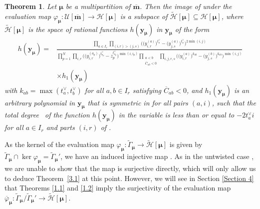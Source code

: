 \documentclass[pdftex]{sigma}
\numberwithin{equation}{section}
\newtheorem{Theorem}{Theorem}[section]
\begin{document}
\begin{Theorem}\label{3.9}
Let $\bm{\mu}$ be a multipartition of $\overline{\mathbf{m}}$. Then the image \smash{$\varphi_{\bm{\mu}}\bigl(\tilde{\Gamma}_{\bm{\mu}}\bigr)$} of \smash{$\tilde{\Gamma}_{\bm{\mu}}$} under the evaluation map $\varphi_{\bm{\mu}}\colon\mathcal{U}[\overline{\mathbf{m}}]\to \mathcal{H}[\bm{\mu}]$ is a subspace of $\tilde{\mathcal{H}}[\bm{\mu}]\subseteq\mathcal{H}[\bm{\mu}]$, where $\tilde{ \mathcal{H}}[\bm{\mu}]$ is the space of rational functions
$h(\mathbf{y}_{\bm{\mu}})$ in $\mathbf{y}_{\bm{\mu}}$ of the form
\begin{align}
h(\mathbf{y}_{\bm{\mu}})
={}&\frac{\prod_{a\in I_r}\prod_{(i,r)>(j,s)}\bigl(\bigl(y_{i,r}^{(a)}\bigr)^{t_a^{\vee}}-\bigl(y_{j,s}^{(a)}\bigr) ^{t_a^{\vee}}\bigr)^{2\min(i,j)}}{\prod_{p=1}^N \prod_{i,r}\bigl(\bigl(y_{i,r}^{(a_p)}\bigr)^{t_{a_p}^{\vee}}-z_p^{t_{a_p} ^{\vee}})^{\min(i,i_p)}\prod_{\substack{a<b\\ \overline{C}_{ab}<0}}\prod_{i, j,r,s}\bigl(\bigl(y_{i,r}^{(a)}\bigr)^{k_{ab}}-\bigl(y_{j,s}^{(b)}\bigr) ^{k_{ab}}\bigr)^{\min(i,j)}}\nonumber\\
&\times h_1(\mathbf{y}_{\bm{\mu}})\label{eq:3.45}
\end{align}
with $k_{ab}=\max(t_a^{\vee},t_b^{\vee})$ for all $a,b\in I_r$ satisfying $\overline{C}_{ab}<0$, and $h_1(\mathbf{y}_{\bm{ \mu}})$ is an arbitrary polynomial in $\mathbf{y}_{\bm{\mu}}$ that is symmetric in  for all pairs $(a,i)$, such that the total degree~ of the function $h(\mathbf{y}_{\bm{ \mu}})$ in the variable  is less than or equal to $-2t_a^{\vee}i$ for all $a\in I_r$ and parts $(i,r)$ of .
\end{Theorem}

As the kernel of the evaluation map $\varphi_{\bm{\mu}} \colon\tilde{\Gamma}_{\bm{\mu}}\to\tilde{\mathcal{H}}[\bm{\mu}]$ is given by $\tilde{\Gamma}_{\bm{\mu}}\cap\ker\varphi_{\bm{\mu}} =\tilde{\Gamma}_{\bm{\mu}}'$, we have an induced injective map . As in the untwisted case \cite{AK07,AKS06}, we are unable to show that the map  is surjective directly, which will only allow us to deduce Theorem~\ref{3.1} at this point. However, we will see in Section \ref{Section 4} that Theorems \ref{1.1} and \ref{1.2} imply the surjectivity of the evaluation map $\overline{\varphi}_{ \bm{\mu}}\colon\tilde{\Gamma}_{\bm{\mu}}/\tilde{\Gamma}_{\bm{\mu}}' \to\tilde{\mathcal{H}}[\bm{\mu}]$.
\end{document}
